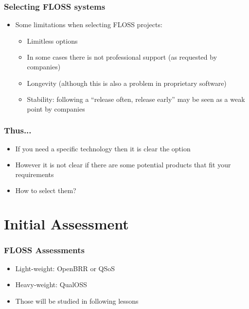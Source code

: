 \begin{frame}
\frametitle{Selecting FLOSS systems}

\begin{itemize}
\item Some limitations when selecting FLOSS projects:
 \begin{itemize}
  \item Limitless options
  \item In some cases there is not professional support (as requested by companies)
  \item Longevity (although this is also a problem in proprietary software)
  \item Stability: following a ``release often, release early'' may be seen as a weak point by companies
 \end{itemize}
\end{itemize}
\end{frame}


\begin{frame}
\frametitle{Thus...}

\begin{itemize}
\item If you need a specific technology then it is clear the option
\item However it is not clear if there are some potential products that fit your requirements
\item How to select them?
\end{itemize}
\end{frame}

\section{Initial Assessment}



\begin{frame}
\frametitle{FLOSS Assessments}

\begin{itemize}
\item Light-weight: OpenBRR or QSoS
\item Heavy-weight: QualOSS
\item Those will be studied in following lessons
\end{itemize}
\end{frame}


